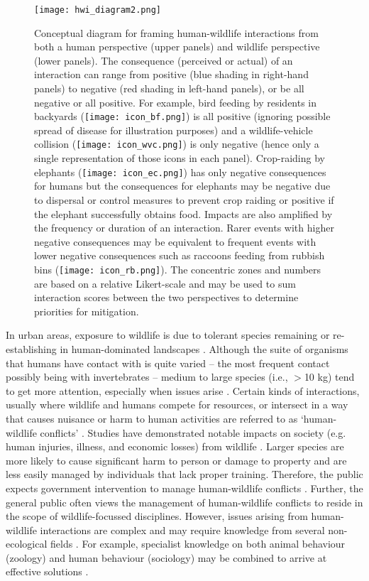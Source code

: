 \begin{figure*}[!t]
  \centering
  \texttt{[image: hwi\_diagram2.png]}
  \caption[Conceptual diagram for framing human-wildlife interactions]{Conceptual diagram for framing human-wildlife interactions from both a human perspective (upper panels) and wildlife perspective (lower panels). The consequence (perceived or actual) of an interaction can range from positive (blue shading in right-hand panels) to negative (red shading in left-hand panels), or be all negative or all positive.  For example, bird feeding by residents in backyards (\texttt{[image: icon\_bf.png]}) is all positive (ignoring possible spread of disease for illustration purposes) and a wildlife-vehicle collision (\texttt{[image: icon\_wvc.png]}) is only negative (hence only a single representation of those icons in each panel). Crop-raiding by elephants (\texttt{[image: icon\_ec.png]}) has only negative consequences for humans but the consequences for elephants may be negative due to dispersal or control measures to prevent crop raiding or positive if the elephant successfully obtains food. Impacts are also amplified by the frequency or duration of an interaction. Rarer events with higher negative consequences may be equivalent to frequent events with lower negative consequences such as raccoons feeding from rubbish bins (\texttt{[image: icon\_rb.png]}). The concentric zones and numbers are based on a relative Likert-scale and may be used to sum interaction scores between the two perspectives to determine priorities for mitigation.}
  \label{hmi_diagram}
\end{figure*}

In urban areas, exposure to wildlife is due to tolerant species remaining or re-establishing in human-dominated landscapes \citep{soul16}. Although the suite of organisms that humans have contact with is quite varied -- the most frequent contact possibly being with invertebrates -- medium to large species (i.e., $>$10 kg) tend to get more attention, especially when issues arise \citep{seor16}. Certain kinds of interactions, usually where wildlife and humans compete for resources, or intersect in a way that causes nuisance or harm to human activities are referred to as `human-wildlife conflicts' \citep[but see][]{pete10}. Studies have demonstrated notable impacts on society (e.g. human injuries, illness, and economic losses) from wildlife \citep[e.g.][]{cono95}. Larger species are more likely to cause significant harm to person or damage to property \citep{cono01} and are less easily managed by individuals that lack proper training. Therefore, the public expects government intervention to manage human-wildlife conflicts \citep{reit99}. Further, the general public often views the management of human-wildlife conflicts to reside in the scope of wildlife-focussed disciplines. However, issues arising from human-wildlife interactions are complex and may require knowledge from several non-ecological fields \citep{deck97,madd04}. For example, specialist knowledge on both animal behaviour (zoology) and human behaviour (sociology) may be combined to arrive at effective solutions \citep{dicka10}.

